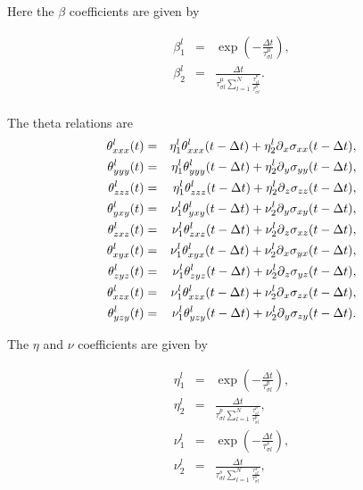 \documentclass[11pt]{article}
\begin{document}
Here the $\beta$ coefficients are given by

\begin{eqnarray}
\beta^l_1  & = &\exp(-\frac{\Delta t}{\tau^{\mu}_{\sigma l}}) , \nonumber \\
\beta^l_2  & = &\frac{\Delta t}{\tau^{\mu}_{\sigma l}\sum_{l=1}^N
                                 \frac{\tau^{\mu}_{\epsilon l}}
                                  {\tau^{\mu}_{\sigma l}}}.
                                                                \nonumber\\
\end{eqnarray}

The theta relations are
\begin{eqnarray}
\theta^l_{xxx}(t)  & = &\eta^l_1 \theta^l_{xxx}(t-\Delta t) 
            + \eta^l_2\mbox{$\partial$}_x\sigma_{xx}(t-\Delta t),  \nonumber \\
\theta^l_{yyy}(t)  & = &\eta^l_1 \theta^l_{yyy}(t-\Delta t) 
            + \eta^l_2\mbox{$\partial$}_y\sigma_{yy}(t-\Delta t),  \nonumber \\
\theta^l_{zzz}(t)  & = &\eta^l_1 \theta^l_{zzz}(t-\Delta t) 
            + \eta^l_2\mbox{$\partial$}_z\sigma_{zz}(t-\Delta t),  \nonumber \\
\theta^l_{yxy}(t)  & = &\nu^l_1 \theta^l_{yxy}(t-\Delta t) 
            + \nu^l_2\mbox{$\partial$}_y\sigma_{xy}(t-\Delta t),  \nonumber \\
\theta^l_{zxz}(t)  & = &\nu^l_1 \theta^l_{zxz}(t-\Delta t) 
            + \nu^l_2\mbox{$\partial$}_z\sigma_{xz}(t-\Delta t),  \nonumber \\
\theta^l_{xyx}(t)  & = &\nu^l_1 \theta^l_{xyx}(t-\Delta t) 
            + \nu^l_2\mbox{$\partial$}_x\sigma_{yx}(t-\Delta t),  \nonumber \\
\theta^l_{zyz}(t)  & = &\nu^l_1 \theta^l_{zyz}(t-\Delta t) 
            + \nu^l_2\mbox{$\partial$}_z\sigma_{yz}(t-\Delta t),  \nonumber \\
\theta^l_{xzx}(t)  & = &\nu^l_1 \theta^l_{xzx}(t-\Delta t) 
            + \nu^l_2\mbox{$\partial$}_x\sigma_{zx}(t-\Delta t),  \nonumber \\
\theta^l_{yzy}(t)  & = &\nu^l_1 \theta^l_{yzy}(t-\Delta t) 
            + \nu^l_2\mbox{$\partial$}_y\sigma_{zy}(t-\Delta t).  \nonumber \\
\end{eqnarray}

The $\eta$ and $\nu$ coefficients are given by

\begin{eqnarray}
\eta^l_1  & = &\exp(-\frac{\Delta t}{\tau^{p}_{\sigma l}}) , \nonumber \\
\eta^l_2  & = &\frac{\Delta t}{\tau^{p}_{\sigma l}\sum_{l=1}^N
                                 \frac{\tau^{p}_{\epsilon l}}
                                  {\tau^{p}_{\sigma l}}}, \nonumber \\
\nu^l_1  & = &\exp(-\frac{\Delta t}{\tau^{s}_{\sigma l}}) , \nonumber \\
\nu^l_2  & = &\frac{\Delta t}{\tau^{s}_{\sigma l}\sum_{l=1}^N
                           \frac{\tau^{s}_{\epsilon l}}
                            {\tau^{s}_{\sigma l}}}, \nonumber \\
\end{eqnarray}
\end{document}
